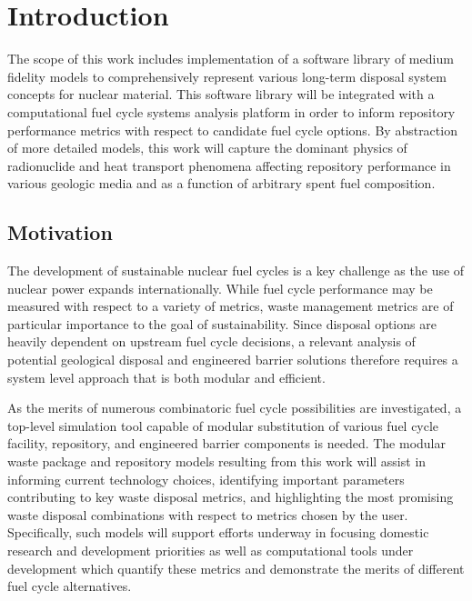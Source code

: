 \chapter{Introduction}\label{ch:introduction}

The scope of this work includes implementation of a software library 
of medium fidelity models to comprehensively represent various long-term 
disposal system concepts for nuclear material. This software library will 
be integrated with a computational fuel cycle systems analysis platform 
in order to inform repository performance metrics with respect to 
candidate fuel cycle options. By abstraction of more detailed models, this 
work will capture the dominant physics of radionuclide and heat transport 
phenomena affecting repository performance in various geologic media and as 
a function of arbitrary spent fuel composition. 

\section{Motivation} 

The development of sustainable nuclear fuel cycles is a key challenge 
as the use of nuclear power expands internationally. While fuel cycle 
performance may be measured with respect to a variety of metrics, 
waste management metrics are of particular importance to the goal of 
sustainability. Since disposal options are heavily dependent on 
upstream fuel cycle decisions, a relevant analysis of potential 
geological disposal and engineered barrier solutions therefore 
requires a system level approach that is both modular and efficient. 

As the merits of numerous combinatoric fuel cycle possibilities are 
investigated, a top-level simulation tool capable of modular 
substitution of various fuel cycle facility, repository, and 
engineered barrier components is needed. The modular waste package and 
repository models resulting from this work will assist in informing 
current technology choices, identifying important parameters 
contributing to key waste disposal metrics, and highlighting the most 
promising waste disposal combinations with respect to metrics chosen by
the user. Specifically, such models will support efforts underway in 
focusing domestic research and development priorities as well as 
computational tools under development which quantify these metrics and 
demonstrate the merits of different fuel cycle alternatives. 

